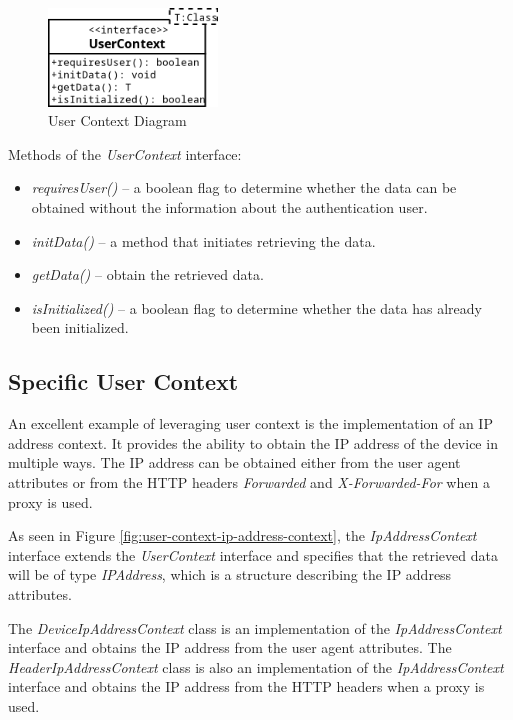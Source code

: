 \begin{figure}[htbp]
  \centering
  \includegraphics[width=0.4\textwidth]{img/sections/5-design/userContext.png}
  \caption{User Context Diagram}
  \label{fig:user-context-diagram}
\end{figure}

Methods of the \textit{UserContext} interface:
\begin{itemize}
    \item \textit{requiresUser()} -- a boolean flag to determine whether the data can be obtained without the information about the authentication user.
    \item \textit{initData()} -- a method that initiates retrieving the data.
    \item \textit{getData()} -- obtain the retrieved data. 
    \item \textit{isInitialized()} -- a boolean flag to determine whether the data has already been initialized. 
\end{itemize}

\newpage

\subsection{Specific User Context}
An excellent example of leveraging user context is the implementation of an IP address context.
It provides the ability to obtain the IP address of the device in multiple ways.
The IP address can be obtained either from the user agent attributes or from the HTTP headers \textit{Forwarded} and \textit{X-Forwarded-For} when a proxy is used.

As seen in Figure \ref{fig:user-context-ip-address-context}, the \textit{IpAddressContext} interface extends the \textit{UserContext} interface and specifies that the retrieved data will be of type \textit{IPAddress}, which is a structure describing the IP address attributes.

The \textit{DeviceIpAddressContext} class is an implementation of the \textit{IpAddressContext} interface and obtains the IP address from the user agent attributes.
The \textit{HeaderIpAddressContext} class is also an implementation of the \textit{IpAddressContext} interface and obtains the IP address from the HTTP headers when a proxy is used.

